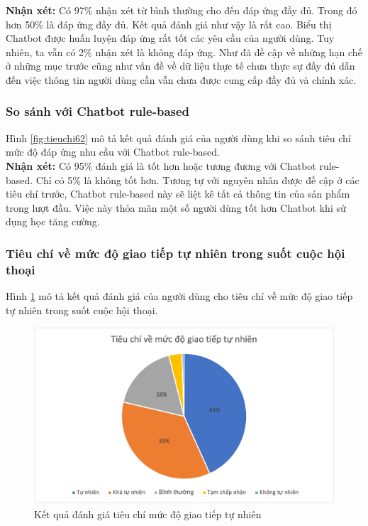 \textbf{Nhận xét:}
Có 97\% nhận xét từ bình thường cho đến đáp ứng đầy đủ. Trong đó hơn 50\% là đáp ứng đầy đủ. Kết quả đánh giá như vậy là rất cao. Biểu thị Chatbot được huấn luyện đáp ứng rất tốt các yêu cầu của người dùng. Tuy nhiên, ta vẫn có 2\% nhận xét là không đáp ứng. Như đã đề cập về những hạn chế ở những mục trước cũng như vấn đề về dữ liệu thực tế chưa thực sự đầy đủ dẫn đến việc thông tin người dùng cần vẫn chưa được cung cấp đầy đủ và chính xác.

\subsubsection{So sánh với Chatbot rule-based}
Hình \ref{fig:tieuchi62} mô tả kết quả đánh giá của người dùng khi so sánh tiêu chí mức độ đáp ứng nhu cầu với Chatbot rule-based.\\

\textbf{Nhận xét:}
Có 95\% đánh giá là tốt hơn hoặc tương đương với Chatbot rule-based. Chỉ có 5\% là không tốt hơn. Tương tự với nguyên nhân được đề cập ở các tiêu chí trước, Chatbot rule-based này sẽ liệt kê tất cả thông tin của sản phẩm trong lượt đầu. Việc này thỏa mãn một số người dùng tốt hơn Chatbot khi sử dụng học tăng cường.

\subsubsection{Tiêu chí về mức độ giao tiếp tự nhiên trong suốt cuộc hội thoại}
Hình \ref{fig:tieuchi7} mô tả kết quả đánh giá của người dùng cho tiêu chí về mức độ giao tiếp tự nhiên trong suốt cuộc hội thoại.

\begin{center}
    \begin{figure}[h!]
        \begin{center}
         \includegraphics[scale=0.91]{chapter7/img/tieuchi7.png}
        \end{center}
        \caption{Kết quả đánh giá tiêu chí mức độ giao tiếp tự nhiên}
        \label{fig:tieuchi7}
    \end{figure}
\end{center}

